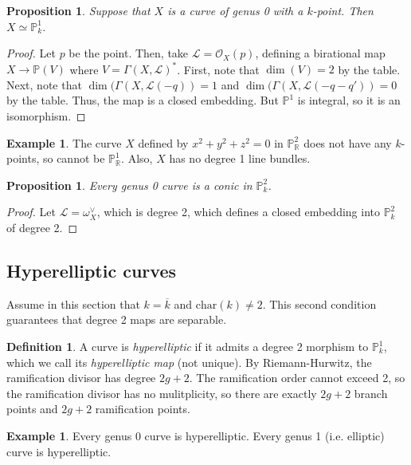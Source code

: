 \documentclass[10pt]{article}
\newtheorem{prop}[thm]{Proposition}
\theoremstyle{definition}
\newtheorem{exmp}[thm]{Example}
\newtheorem{defn}[thm]{Definition}
\newcommand{\PP}{\mathbb{P}}
\newcommand{\R}{\mathbb{R}}
\newcommand{\OO}{\mathcal{O}}
\newcommand{\LL}{\mathcal{L}}
\begin{document}
\begin{prop}
Suppose that $X$ is a curve of genus 0 with a $k$-point.  Then $X \simeq \PP^1_k$.
\end{prop}
\begin{proof}
Let $p$ be the point.  Then, take $\LL = \OO_X(p)$, defining a birational map $X \rightarrow \PP(V)$ where $V = \Gamma(X, \LL)^*$.  First, note that $\dim(V) = 2$ by the table.  Next, note that $\dim(\Gamma(X, \LL(-q)) = 1$ and $\dim(\Gamma(X, \LL(-q-q')) = 0$ by the table.  Thus, the map is a closed embedding.  But $\PP^1$ is integral, so it is an isomorphism.
\end{proof}

\begin{exmp}
The curve $X$ defined by $x^2 + y^2 + z^2 = 0$ in $\PP^2_{\R}$ does not have any $k$-points, so cannot be $\PP^1_{\R}$.  Also, $X$ has no degree 1 line bundles.
\end{exmp}

\begin{prop}
Every genus 0 curve is a conic in $\PP^2_k$.
\end{prop}
\begin{proof}
Let $\LL = \omega_X^\vee$, which is degree 2, which defines a closed embedding into $\PP^2_k$ of degree 2.
\end{proof}


\subsection{Hyperelliptic curves}

Assume in this section that $k = \overline{k}$ and $\mathrm{char}(k) \ne 2$.  This second condition guarantees that degree 2 maps are separable.



\begin{defn}
A curve is \emph{hyperelliptic} if it admits a degree 2 morphism to $\PP^1_k$, which we call its \emph{hyperelliptic map} (not unique).  By Riemann-Hurwitz, the ramification divisor has degree $2g+2$.  The ramification order cannot exceed 2, so the ramification divisor has no mulitplicity, so there are exactly $2g+2$ branch points and $2g+2$ ramification points.
\end{defn}

\begin{exmp}
Every genus 0 curve is hyperelliptic.  Every genus 1 (i.e. elliptic) curve is hyperelliptic.
\end{exmp}
\end{document}
